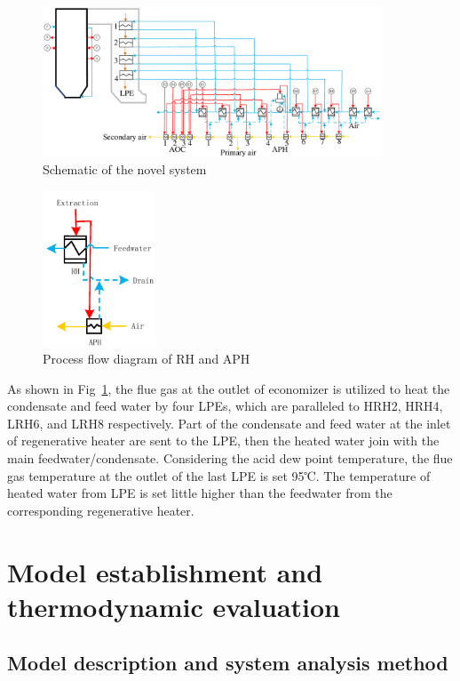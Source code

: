 \documentclass[preprint,12pt]{elsarticle}
\begin{document}
\begin{figure}[htbp]
\centering
\includegraphics[width=0.9\textwidth]{fig/novel_system}
\caption{Schematic of the novel system} 
\label{fig:novel_system}
\end{figure}

\begin{figure}[htbp]
\centering
\includegraphics[width=0.3\textwidth]{fig/extraction_heat_APH}%
\caption{Process flow diagram of RH and APH} 
\label{fig:extraction_heat_APH}
\end{figure}
As shown in Fig~\ref{fig:novel_system}, the flue gas at the outlet of economizer is utilized to heat the condensate and feed water by four LPEs, which are paralleled to HRH2, HRH4, LRH6, and LRH8 respectively. 
Part of the condensate and feed water at the inlet of regenerative heater are sent to the LPE, then the heated water join with the main feedwater/condensate. 
Considering the acid dew point temperature, the flue gas temperature at the outlet of the last LPE is set 95℃. 
The temperature of heated water from LPE is set little higher than the feedwater from the corresponding regenerative heater.%

\section{Model establishment and thermodynamic evaluation} %
\label{sec3:modle est and eval}
\subsection{Model description and system analysis method} %
\label{ssub:model_establishment_and_system_analysis_method}
\end{document}
